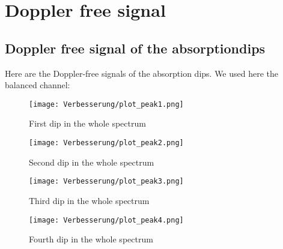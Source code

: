 \section{Doppler free signal}
\subsection{Doppler free signal of the absorptiondips}
Here are the Doppler-free signals of the absorption dips.
We used here the balanced channel:
\begin{figure}[h]
    \centering\texttt{[image: Verbesserung/plot\_peak1.png]}
    \caption{First dip in the whole spectrum}
\end{figure}
\begin{figure}[h]
    \centering\texttt{[image: Verbesserung/plot\_peak2.png]}
    \caption{Second dip in the whole spectrum}
\end{figure}
\begin{figure}[h]
    \centering\texttt{[image: Verbesserung/plot\_peak3.png]}
    \caption{Third dip in the whole spectrum}
\end{figure}
\begin{figure}[h]
    \centering\texttt{[image: Verbesserung/plot\_peak4.png]}
    \caption{Fourth dip in the whole spectrum}
\end{figure}\newpage
